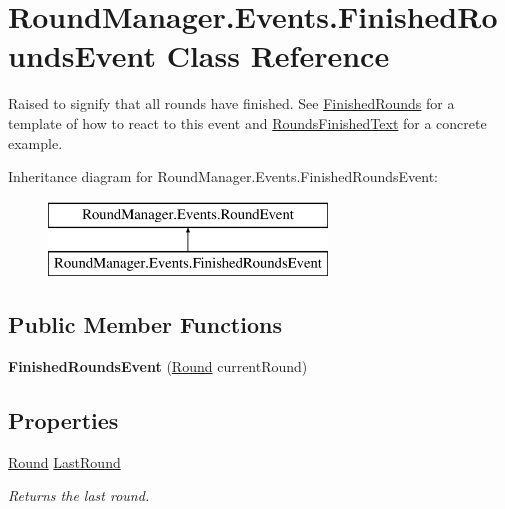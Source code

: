 \hypertarget{class_round_manager_1_1_events_1_1_finished_rounds_event}{}\section{Round\+Manager.\+Events.\+Finished\+Rounds\+Event Class Reference}
\label{class_round_manager_1_1_events_1_1_finished_rounds_event}


Raised to signify that all rounds have finished. See \hyperlink{class_round_manager_1_1_finished_rounds}{Finished\+Rounds} for a template of how to react to this event and \hyperlink{class_round_manager_1_1_rounds_finished_text}{Rounds\+Finished\+Text} for a concrete example.  


Inheritance diagram for Round\+Manager.\+Events.\+Finished\+Rounds\+Event\+:\begin{figure}[H]
\begin{center}
\leavevmode
\includegraphics[height=2.000000cm]{class_round_manager_1_1_events_1_1_finished_rounds_event}
\end{center}
\end{figure}
\subsection*{Public Member Functions}
\begin{DoxyCompactItemize}
\item 
\hypertarget{class_round_manager_1_1_events_1_1_finished_rounds_event_a2f3c3de105f86f05a40afd934f4356ef}{}{\bfseries Finished\+Rounds\+Event} (\hyperlink{class_round_manager_1_1_round}{Round} current\+Round)\label{class_round_manager_1_1_events_1_1_finished_rounds_event_a2f3c3de105f86f05a40afd934f4356ef}

\end{DoxyCompactItemize}
\subsection*{Properties}
\begin{DoxyCompactItemize}
\item 
\hyperlink{class_round_manager_1_1_round}{Round} \hyperlink{class_round_manager_1_1_events_1_1_finished_rounds_event_ad2db13aeab97e348d2c4b3a3c152cd32}{Last\+Round}
\begin{DoxyCompactList}\small\item\em Returns the last round. \end{DoxyCompactList}\end{DoxyCompactItemize}


